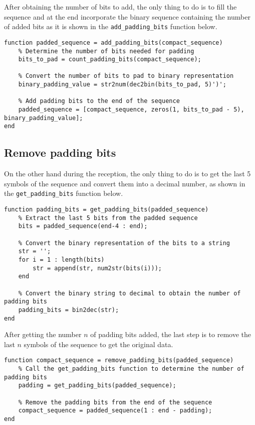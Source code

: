 \noindent After obtaining the number of bits to add, the only thing to do is to fill the sequence and at the end incorporate the binary sequence containing the number of added bits as it is shown in the \texttt{add\_padding\_bits} function below.

\begin{lstlisting}
function padded_sequence = add_padding_bits(compact_sequence)
    % Determine the number of bits needed for padding
    bits_to_pad = count_padding_bits(compact_sequence);

    % Convert the number of bits to pad to binary representation
    binary_padding_value = str2num(dec2bin(bits_to_pad, 5)')';

    % Add padding bits to the end of the sequence
    padded_sequence = [compact_sequence, zeros(1, bits_to_pad - 5), binary_padding_value];
end
\end{lstlisting}


\subsection{Remove padding bits}
On the other hand during the reception, the only thing to do is to get the last 5 symbols of the sequence and convert them into a decimal number, as shown in the \texttt{get\_padding\_bits} function below.

\begin{lstlisting}
function padding_bits = get_padding_bits(padded_sequence)
    % Extract the last 5 bits from the padded sequence
    bits = padded_sequence(end-4 : end);
    
    % Convert the binary representation of the bits to a string
    str = '';
    for i = 1 : length(bits)
        str = append(str, num2str(bits(i)));
    end
    
    % Convert the binary string to decimal to obtain the number of padding bits
    padding_bits = bin2dec(str);
end
\end{lstlisting}

\noindent After getting the number $n$ of padding bits added, the last step is to remove the last $n$ symbols of the sequence to get the original data.

\begin{lstlisting}
function compact_sequence = remove_padding_bits(padded_sequence)
    % Call the get_padding_bits function to determine the number of padding bits
    padding = get_padding_bits(padded_sequence);

    % Remove the padding bits from the end of the sequence
    compact_sequence = padded_sequence(1 : end - padding);
end
\end{lstlisting}

